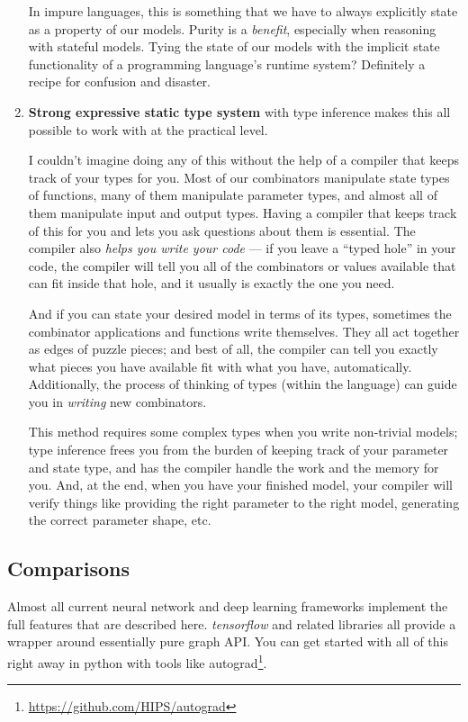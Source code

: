 \documentclass[]{article}
\renewcommand{\href}[2]{#2\footnote{\url{#1}}}
\begin{document}
\begin{enumerate}
  In impure languages, this is something that we have to always explicitly state
  as a property of our models. Purity is a \emph{benefit}, especially when
  reasoning with stateful models. Tying the state of our models with the
  implicit state functionality of a programming language's runtime system?
  Definitely a recipe for confusion and disaster.
\item
  \textbf{Strong expressive static type system} with type inference makes this
  all possible to work with at the practical level.

  I couldn't imagine doing any of this without the help of a compiler that keeps
  track of your types for you. Most of our combinators manipulate state types of
  functions, many of them manipulate parameter types, and almost all of them
  manipulate input and output types. Having a compiler that keeps track of this
  for you and lets you ask questions about them is essential. The compiler also
  \emph{helps you write your code} --- if you leave a ``typed hole'' in your
  code, the compiler will tell you all of the combinators or values available
  that can fit inside that hole, and it usually is exactly the one you need.

  And if you can state your desired model in terms of its types, sometimes the
  combinator applications and functions write themselves. They all act together
  as edges of puzzle pieces; and best of all, the compiler can tell you exactly
  what pieces you have available fit with what you have, automatically.
  Additionally, the process of thinking of types (within the language) can guide
  you in \emph{writing} new combinators.

  This method requires some complex types when you write non-trivial models;
  type inference frees you from the burden of keeping track of your parameter
  and state type, and has the compiler handle the work and the memory for you.
  And, at the end, when you have your finished model, your compiler will verify
  things like providing the right parameter to the right model, generating the
  correct parameter shape, etc.
\end{enumerate}

\hypertarget{comparisons}{%
\subsection{Comparisons}\label{comparisons}}

Almost all current neural network and deep learning frameworks implement the
full features that are described here. \emph{tensorflow} and related libraries
all provide a wrapper around essentially pure graph API. You can get started
with all of this right away in python with tools like
\href{https://github.com/HIPS/autograd}{autograd}.
\end{document}
